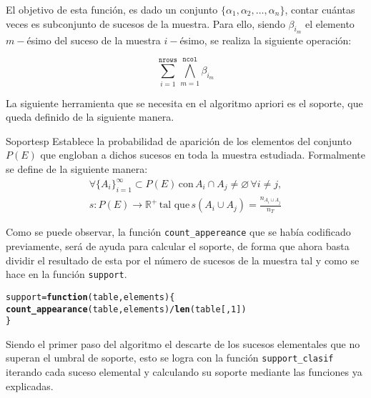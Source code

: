 \documentclass[12pt]{report}\usepackage[]{graphicx}\usepackage[dvipsnames]{xcolor}
\makeatletter
\newcommand{\hlnum}[1]{\textcolor[rgb]{0.686,0.059,0.569}{#1}}%
\newcommand{\hlopt}[1]{\textcolor[rgb]{0,0,0}{#1}}%
\newcommand{\hlstd}[1]{\textcolor[rgb]{0.345,0.345,0.345}{#1}}%
\newcommand{\hlkwa}[1]{\textcolor[rgb]{0.161,0.373,0.58}{\textbf{#1}}}%
\newcommand{\hlkwb}[1]{\textcolor[rgb]{0.69,0.353,0.396}{#1}}%
\newcommand{\hlkwc}[1]{\textcolor[rgb]{0.333,0.667,0.333}{#1}}%
\newcommand{\hlkwd}[1]{\textcolor[rgb]{0.737,0.353,0.396}{\textbf{#1}}}%
\newenvironment{kframe}{%
 \def\at@end@of@kframe{}%
 \ifinner\ifhmode%
  \def\at@end@of@kframe{\end{minipage}}%
  \begin{minipage}{\columnwidth}%
 \fi\fi%
 \def\FrameCommand##1{\hskip\@totalleftmargin \hskip-\fboxsep
 \colorbox{shadecolor}{##1}\hskip-\fboxsep
     \hskip-\linewidth \hskip-\@totalleftmargin \hskip\columnwidth}%
 \MakeFramed {\advance\hsize-\width
   \@totalleftmargin\z@ \linewidth\hsize
   \@setminipage}}%
 {\par\unskip\endMakeFramed%
 \at@end@of@kframe}
\newenvironment{knitrout}{}{} %
\makeatother
\begin{document}
			El objetivo de esta función, es dado un conjunto $\{\alpha_1, \alpha_2, \ldots, \alpha_n\}$, contar cuántas veces es subconjunto de sucesos de la muestra. Para ello, siendo $\beta_{i_m}$ el elemento $m-$ésimo del suceso de la muestra $i-$ésimo, se realiza la siguiente operación: 
			
			$$
			\sum_{i=1}^\texttt{nrows}\bigwedge_{m=1}^\texttt{ncol}\beta_{i_m}
			$$
			
			La siguiente herramienta que se necesita en el algoritmo apriori es el soporte, que queda definido de la siguiente manera. 
			
			\begin{definicion}{Soporte}{sp}
				Establece la probabilidad de aparición de los elementos del conjunto $P(E)$ que engloban a dichos sucesos en toda la muestra estudiada. Formalmente se define de la siguiente manera: 
				\begin{equation*}
					\begin{gathered}
						\forall\{A_i\}_{i=1}^\infty \subset P(E) \, \text{con} \, A_i \cap A_j \neq \varnothing \, \forall i \neq j, \\
						s: P(E) \longrightarrow \mathbb{R}^+ \, \text{tal que} \, s(A_i \cup A_j) = \frac{n_{A_i \cup A_j}}{n_T}
					\end{gathered}
				\end{equation*}
			\end{definicion}
			
			Como se puede observar, la función \texttt{count\_appereance} que se había codificado previamente, será de ayuda para calcular el soporte, de forma que ahora basta dividir el resultado de esta por el número de sucesos de la muestra tal y como se hace en la función \texttt{support}. 
			
\begin{knitrout}
\color{fgcolor}\begin{kframe}
\begin{alltt}
\hlstd{support} \hlkwb{=} \hlkwa{function}\hlstd{(}\hlkwc{table}\hlstd{,} \hlkwc{elements}\hlstd{) \{}
        \hlkwd{count_appearance}\hlstd{(table, elements)} \hlopt{/} \hlkwd{len}\hlstd{(table[,}\hlnum{1}\hlstd{])}
\hlstd{\}}
\end{alltt}
\end{kframe}
\end{knitrout}
			
			Siendo el primer paso del algoritmo el descarte de los sucesos elementales que no superan el umbral de soporte, esto se logra con la función \texttt{support\_clasif} iterando cada suceso elemental y calculando su soporte mediante las funciones ya explicadas. 
			
\end{document}
